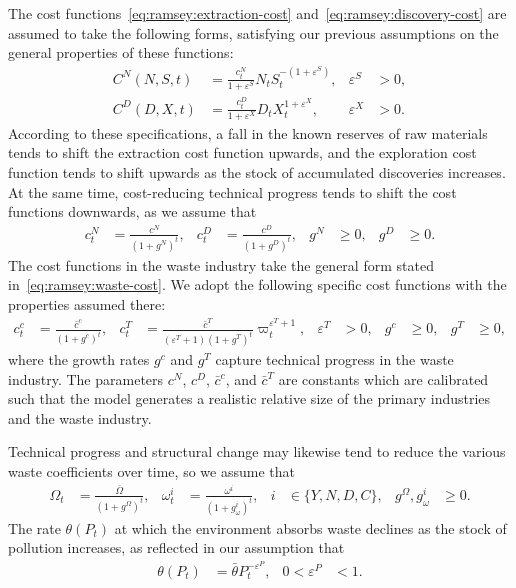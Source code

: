 The cost functions~\eqref{eq:ramsey:extraction-cost} and~\eqref{eq:ramsey:discovery-cost} are assumed to take the following forms, satisfying our previous assumptions on the general properties of these functions:
\begin{align}
C^N(N,S,t) &= \frac{c_t^N}{1+\varepsilon^S} N_t S_t^{-(1+\varepsilon^S)},
&
\varepsilon^S &> 0,
\label{eq:quant:extraction-cost}
\\
C^D(D,X,t) &= \frac{c_t^D}{1+\varepsilon^X} D_t X_t^{1+\varepsilon^X},
&
\varepsilon^X &> 0.
\label{eq:quant:discovery-cost}
\end{align}
According to these specifications, a fall in the known reserves of raw materials tends to shift the extraction cost function upwards, and the exploration cost function tends to shift upwards as the stock of accumulated discoveries increases. At the same time, cost-reducing technical progress tends to shift the cost functions downwards, as we assume that
\begin{align}
c_t^N &= \frac{c^N}{(1+g^N)^t},
&
c_t^D &= \frac{c^D}{(1+g^D)^t},
&
g^N &\ge 0,
&
g^D &\ge 0.
\label{eq:quant:extraction-discovery-progress}
\end{align}
The cost functions in the waste industry take the general form stated in~\eqref{eq:ramsey:waste-cost}. We adopt the following specific cost functions with the properties assumed there:
\begin{align}
c_t^c &= \frac{\bar c^c}{(1+g^c)^t},
&
c_t^T &= \frac{\bar c^T}{(\varepsilon^T+1)(1+g^T)^t}\varpi_t^{\varepsilon^T+1},
&
\varepsilon^T &> 0,
&
g^c &\ge 0,
&
g^T &\ge 0,
\label{eq:quant:waste-cost-progress}
\end{align}
where the growth rates $g^c$ and $g^T$ capture technical progress in the waste industry. The parameters $c^N$, $c^D$, $\bar c^c$, and $\bar c^T$ are constants which are calibrated such that the model generates a realistic relative size of the primary industries and the waste industry.

Technical progress and structural change may likewise tend to reduce the various waste coefficients over time, so we assume that
\begin{align}
\Omega_t &= \frac{\bar\Omega}{(1+g^\Omega)^t},
&
\omega_t^i &= \frac{\omega^i}{(1+g_\omega^i)^t},
&
i &\in \{Y,N,D,C\},
&
g^\Omega, g_\omega^i &\ge 0.
\label{eq:quant:waste-coefficients}
\end{align}
The rate $\theta(P_t)$ at which the environment absorbs waste declines as the stock of pollution increases, as reflected in our assumption that
\begin{align}
\theta(P_t) &= \bar\theta P_t^{-\varepsilon^P},
&
0<\varepsilon^P&<1.
\label{eq:quant:absorption}
\end{align}

